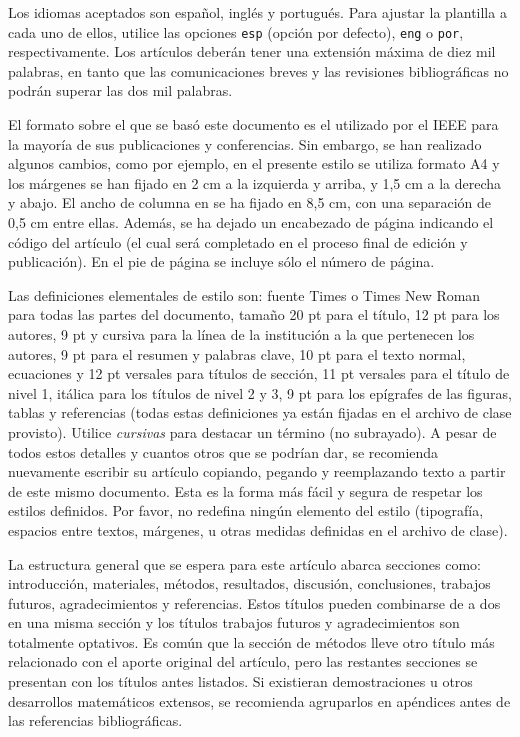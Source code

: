 \documentclass[esp]{FCEFyN-class}
\begin{document}
Los idiomas aceptados son español, inglés y portugués. Para ajustar la plantilla a cada uno de ellos,
utilice las opciones \texttt{esp} (opción por defecto), \texttt{eng} o \texttt{por}, respectivamente.
Los artículos deberán tener una extensión máxima de diez mil palabras, en tanto que las comunicaciones
breves y las revisiones bibliográficas no podrán superar las dos mil palabras.

El formato sobre el que se basó este documento es el utilizado por el IEEE para la mayoría de sus
publicaciones y conferencias. Sin embargo, se han realizado algunos cambios, como por ejemplo, en el
presente estilo se utiliza formato A4 y los márgenes se han fijado en 2 cm a la izquierda y arriba, y
1,5 cm a la derecha y abajo.
El ancho de columna en se ha fijado en 8,5 cm, con una separación de 0,5 cm entre ellas. Además,
se ha dejado un encabezado de página indicando el código del artículo (el cual será completado en el 
proceso final de edición y publicación). En el pie de página se incluye sólo el número de página.

Las definiciones elementales de estilo son: fuente Times o Times New Roman para todas las partes del
documento, tamaño 20 pt para el título, 12 pt para los autores, 9 pt y cursiva para la línea de la
institución a la que pertenecen los autores, 9 pt para el resumen y palabras clave, 10 pt para el
texto normal, ecuaciones y 12 pt versales para títulos de sección, 11 pt versales para el título de 
nivel 1, itálica para los títulos de nivel 2 y 3, 9 pt para los epígrafes de las figuras, tablas y
referencias (todas estas definiciones ya están fijadas en el archivo de clase provisto).
Utilice \emph{cursivas} para destacar un término (no subrayado). A pesar de todos estos
detalles y cuantos otros que se podrían dar, se recomienda nuevamente escribir su artículo copiando,
pegando y reemplazando texto a partir de este mismo documento. Esta es la forma más fácil y segura de
respetar los estilos definidos. Por favor, no redefina ningún elemento del estilo (tipografía,
espacios entre textos, márgenes, u otras medidas definidas en el archivo de clase).

La estructura general que se espera para este artículo abarca secciones como: introducción,
materiales, métodos, resultados, discusión, conclusiones, trabajos futuros, agradecimientos y 
referencias. Estos títulos pueden combinarse de a dos en una misma sección y los títulos trabajos 
futuros y agradecimientos son totalmente optativos. Es común que la sección de métodos lleve otro 
título más relacionado con el aporte original del artículo, pero las restantes secciones se presentan
con los títulos antes listados. Si existieran demostraciones u otros desarrollos matemáticos extensos,
se recomienda agruparlos en apéndices antes de las referencias bibliográficas.
\end{document}
